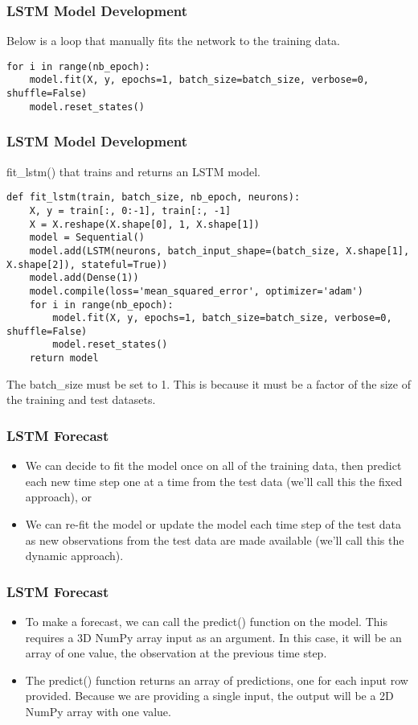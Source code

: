 \begin{frame}[fragile] \frametitle{LSTM Model Development}
Below is a loop that manually fits the network to the training data.
\begin{lstlisting}
for i in range(nb_epoch):
	model.fit(X, y, epochs=1, batch_size=batch_size, verbose=0, shuffle=False)
	model.reset_states()
\end{lstlisting} 

\end{frame}

\begin{frame}[fragile] \frametitle{LSTM Model Development}
 fit\_lstm() that trains and returns an LSTM model.
\begin{lstlisting}
def fit_lstm(train, batch_size, nb_epoch, neurons):
	X, y = train[:, 0:-1], train[:, -1]
	X = X.reshape(X.shape[0], 1, X.shape[1])
	model = Sequential()
	model.add(LSTM(neurons, batch_input_shape=(batch_size, X.shape[1], X.shape[2]), stateful=True))
	model.add(Dense(1))
	model.compile(loss='mean_squared_error', optimizer='adam')
	for i in range(nb_epoch):
		model.fit(X, y, epochs=1, batch_size=batch_size, verbose=0, shuffle=False)
		model.reset_states()
	return model
\end{lstlisting} 
The batch\_size must be set to 1. This is because it must be a factor of the size of the training and test datasets.
\end{frame}

\begin{frame}[fragile] \frametitle{LSTM Forecast}
\begin{itemize}
\item We can decide to fit the model once on all of the training data, then predict each new time step one at a time from the test data (we'll call this the fixed approach), or 
\item We can re-fit the model or update the model each time step of the test data as new observations from the test data are made available (we'll call this the dynamic approach).
\end{itemize}
\end{frame}

\begin{frame}[fragile] \frametitle{LSTM Forecast}
\begin{itemize}
\item To make a forecast, we can call the predict() function on the model. This requires a 3D NumPy array input as an argument. In this case, it will be an array of one value, the observation at the previous time step.
\item The predict() function returns an array of predictions, one for each input row provided. Because we are providing a single input, the output will be a 2D NumPy array with one value.
\end{itemize}
\end{frame}

